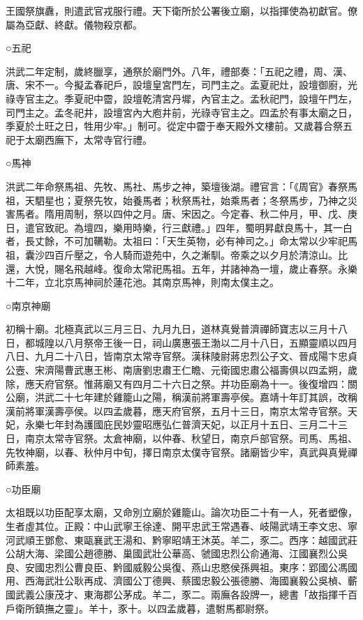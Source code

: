 王國祭旗纛，則遣武官戎服行禮。天下衛所於公署後立廟，以指揮使為初獻官。僚屬為亞獻、終獻。儀物殺京都。

○五祀

洪武二年定制，歲終臘享，通祭於廟門外。八年，禮部奏：「五祀之禮，周、漢、唐、宋不一。今擬孟春祀戶，設壇皇宮門左，司門主之。孟夏祀灶，設壇御廚，光祿寺官主之。季夏祀中霤，設壇乾清宮丹墀，內官主之。孟秋祀門，設壇午門左，司門主之。孟冬祀井，設壇宮內大庖井前，光祿寺官主之。四孟於有事太廟之日，季夏於土旺之日，牲用少牢。」制可。從定中霤于奉天殿外文樓前。又歲暮合祭五祀于太廟西廡下，太常寺官行禮。

○馬神

洪武二年命祭馬祖、先牧、馬社、馬步之神，築壇後湖。禮官言：「《周官》春祭馬祖，天駟星也；夏祭先牧，始養馬者；秋祭馬社，始乘馬者；冬祭馬步，乃神之災害馬者。隋用周制，祭以四仲之月。唐、宋因之。今定春、秋二仲月，甲、戊、庚日，遣官致祀。為壇四，樂用時樂，行三獻禮。」四年，蜀明昇獻良馬十，其一白者，長丈餘，不可加韉勒。太祖曰：「天生英物，必有神司之。」命太常以少牢祀馬祖，囊沙四百斤壓之，令人騎而遊苑中，久之漸馴。帝乘之以夕月於清涼山。比還，大悅，賜名飛越峰。復命太常祀馬祖。五年，并諸神為一壇，歲止春祭。永樂十二年，立北京馬神祠於蓮花池。其南京馬神，則南太僕主之。

○南京神廟

初稱十廟。北極真武以三月三日、九月九日，道林真覺普濟禪師寶志以三月十八日，都城隍以八月祭帝王後一日，祠山廣惠張王渤以二月十八日，五顯靈順以四月八日、九月二十八日，皆南京太常寺官祭。漢秣陵尉蔣忠烈公子文、晉成陽卞忠貞公壼、宋濟陽曹武惠王彬、南唐劉忠肅王仁瞻、元衛國忠肅公福壽俱以四孟朔，歲除，應天府官祭。惟蔣廟又有四月二十六日之祭。并功臣廟為十一。後復增四：關公廟，洪武二十七年建於雞籠山之陽，稱漢前將軍壽亭侯。嘉靖十年訂其誤，改稱漢前將軍漢壽亭侯。以四孟歲暮，應天府官祭，五月十三日，南京太常寺官祭。天妃，永樂七年封為護國庇民妙靈昭應弘仁普濟天妃，以正月十五日、三月二十三日，南京太常寺官祭。太倉神廟，以仲春、秋望日，南京戶部官祭。司馬、馬祖、先牧神廟，以春、秋仲月中旬，擇日南京太僕寺官祭。諸廟皆少牢，真武與真覺禪師素羞。

○功臣廟

太祖既以功臣配享太廟，又命別立廟於雞籠山。論次功臣二十有一人，死者塑像，生者虛其位。正殿：中山武寧王徐達、開平忠武王常遇春、岐陽武靖王李文忠、寧河武順王鄧愈、東甌襄武王湯和、黔寧昭靖王沐英。羊二，豕二。西序：越國武莊公胡大海、梁國公趙德勝、巢國武壯公華高、虢國忠烈公俞通海、江國襄烈公吳良、安國忠烈公曹良臣、黔國威毅公吳復、燕山忠愍侯孫興祖。東序：郢國公馮國用、西海武壯公耿再成、濟國公丁德興、蔡國忠毅公張德勝、海國襄毅公吳楨、蘄國武義公康茂才、東海郡公茅成。羊二，豕二。兩廡各設牌一，總書「故指揮千百戶衛所鎮撫之靈」。羊十，豕十。以四孟歲暮，遣駙馬都尉祭。

